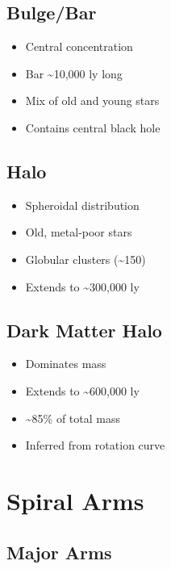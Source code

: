\documentclass[
  11pt,
  letterpaper,
  twoside,
  openright]{book}
\providecommand{\tightlist}{%
  \setlength{\itemsep}{0pt}\setlength{\parskip}{0pt}}
\begin{document}
\subsection{Bulge/Bar}\label{bulgebar}

\begin{itemize}
\tightlist
\item
  Central concentration
\item
  Bar \textasciitilde10,000 ly long
\item
  Mix of old and young stars
\item
  Contains central black hole
\end{itemize}

\subsection{Halo}\label{halo}

\begin{itemize}
\tightlist
\item
  Spheroidal distribution
\item
  Old, metal-poor stars
\item
  Globular clusters (\textasciitilde150)
\item
  Extends to \textasciitilde300,000 ly
\end{itemize}

\subsection{Dark Matter Halo}\label{dark-matter-halo}

\begin{itemize}
\tightlist
\item
  Dominates mass
\item
  Extends to \textasciitilde600,000 ly
\item
  \textasciitilde85\% of total mass
\item
  Inferred from rotation curve
\end{itemize}

\section{Spiral Arms}\label{spiral-arms}

\subsection{Major Arms}\label{major-arms}
\end{document}
